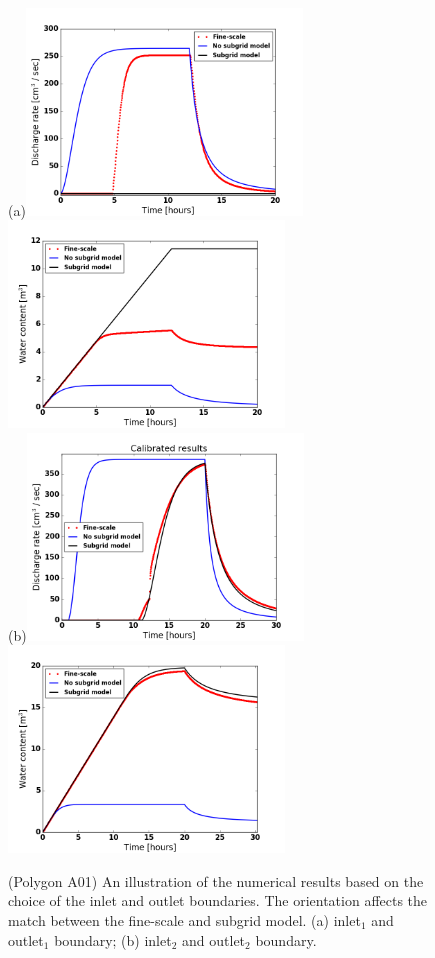 \documentclass[review,11pt]{elsarticle}
\begin{document}
{\begin{figure}[!h]
\centering
(a)\includegraphics[width=6.cm, height=5.5cm]{./figures/POLYGON_A01/POLYGON_A01discharge.png}
\includegraphics[width=6.cm, height=5.5cm]{./figures/POLYGON_A01/POLYGON_A01watercontent.png}\\
(b)\includegraphics[width=6.cm, height=5.5cm]{./figures/POLYGON_A01/POLYGON_A01discharge-CalibDDManningTest3.png}
\includegraphics[width=6.cm, height=5.5cm]{./figures/POLYGON_A01/POLYGON_A01WC-CalibDDManningTest3.png}
\caption{(Polygon A01) An illustration of the numerical results based on the choice of the inlet and outlet boundaries. The orientation affects the match between the fine-scale and subgrid model. (a) inlet$_1$ and outlet$_1$ boundary; (b) inlet$_2$ and outlet$_2$  boundary.}
\label{polygon-A01-fig2}
\end{figure}
}
\end{document}
